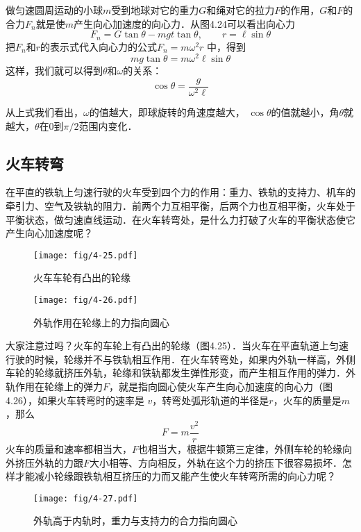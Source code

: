 做匀速圆周运动的小球$m$受到地球对它的重力$G$和绳对它的拉力$F$的作用，$G$和$F$的合力$F_n$就是使$m$产生向心加速度的向心力．从图4.24可以看出向心力
\[F_n=G\tan \theta-mgt\tan\theta,\qquad r=\ell \sin\theta \]
把$F_n$和$r$的表示式代入向心力的公式$F_n=m\omega^2r$
中，得到
\[mg\tan\theta=m\omega^2\ell\sin\theta\]
这样，我们就可以得到$\theta$和$\omega$的关系：
\[\cos\theta =\frac{g}{\omega^2\ell } \]

从上式我们看出，$\omega$的值越大，即球旋转的角速度越大，
$\cos\theta$的值就越小，角$\theta$就越大，$\theta$在0到$\pi/2$范围内变化．

\subsection{火车转弯} 

在平直的铁轨上匀速行驶的火车受到四个力的作用：重力、铁轨的支持力、机车的牵引力、空气及铁轨的阻力．前两个力互相平衡，后两个力也互相平衡，火车处于平衡状态，做匀速直线运动．在火车转弯处，是什么力打破了火车的平衡状态使它产生向心加速度呢？

\begin{figure}[htp]
    \centering
\begin{minipage}[t]{0.48\textwidth}\centering
    \texttt{[image: fig/4-25.pdf]}
    \caption{火车车轮有凸出的轮缘}
\end{minipage}
\begin{minipage}[t]{0.48\textwidth}
    \centering
    \texttt{[image: fig/4-26.pdf]}
    \caption{外轨作用在轮缘上的力指向圆心}
\end{minipage}
\end{figure}

大家注意过吗？火车的车轮上有凸出的轮缘（图4.25）．当火车在平直轨道上匀速行驶的时候，轮缘并不与铁轨相互作用．在火车转弯处，如果内外轨一样高，外侧车轮的轮缘就挤压外轨，轮缘和铁轨都发生弹性形变，而产生相互作用的弹力．外轨作用在轮缘上的弹力$F$，就是指向圆心使火车产生向心加速度的向心力（图4.26），如果火车转弯时的速率是
$v$，转弯处弧形轨道的半径是$r$，火车的质量是$m$，那么
\[F=m\frac{v^2}{r} \]
火车的质量和速率都相当大，$F$也相当大，根据牛顿第三定律，外侧车轮的轮缘向外挤压外轨的力跟$F$大小相等、方向相反，外轨在这个力的挤压下很容易损坏．怎样才能减小轮缘跟铁轨相互挤压的力而又能产生使火车转弯所需的向心力呢？
\begin{figure}[htp]
    \centering
    \texttt{[image: fig/4-27.pdf]}
    \caption{外轨高于内轨时，重力与支持力的合力指向圆心}
\end{figure}

